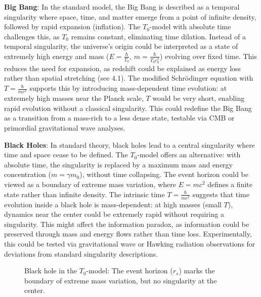 \documentclass[a4paper,12pt]{article}
\begin{document}
	\textbf{Big Bang}: In the standard model, the Big Bang is described as a temporal singularity where space, time, and matter emerge from a point of infinite density, followed by rapid expansion (inflation). The \( T_0 \)-model with absolute time challenges this, as \( T_0 \) remains constant, eliminating time dilation. Instead of a temporal singularity, the universe's origin could be interpreted as a state of extremely high energy and mass (\( E = \frac{\hbar}{T_0} \), \( m = \frac{\hbar}{T_0 c_0^2} \)) evolving over fixed time. This reduces the need for expansion, as redshift could be explained as energy loss rather than spatial stretching (see 4.1). The modified Schrödinger equation with \( T = \frac{\hbar}{m c^2} \) supports this by introducing mass-dependent time evolution: at extremely high masses near the Planck scale, \( T \) would be very short, enabling rapid evolution without a classical singularity. This could redefine the Big Bang as a transition from a mass-rich to a less dense state, testable via CMB or primordial gravitational wave analyses.
	
	\textbf{Black Holes}: In standard theory, black holes lead to a central singularity where time and space cease to be defined. The \( T_0 \)-model offers an alternative: with absolute time, the singularity is replaced by a maximum mass and energy concentration (\( m = \gamma m_0 \)), without time collapsing. The event horizon could be viewed as a boundary of extreme mass variation, where \( E = m c^2 \) defines a finite state rather than infinite density. The intrinsic time \( T = \frac{\hbar}{m c^2} \) suggests that time evolution inside a black hole is mass-dependent: at high masses (small \( T \)), dynamics near the center could be extremely rapid without requiring a singularity. This might affect the information paradox, as information could be preserved through mass and energy flows rather than time loss. Experimentally, this could be tested via gravitational wave or Hawking radiation observations for deviations from standard singularity descriptions.
	
	\begin{figure}[h]
		\centering
		\caption{Black hole in the $T_0$-model: The event horizon ($r_s$) marks the boundary of extreme mass variation, but no singularity at the center.}
	\end{figure}
	
\end{document}
